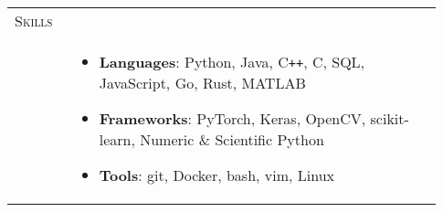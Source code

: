 \documentclass[letterpaper, 10pt, oneside]{article}
\newcommand{\stitle}[1]{\normalsize{\textsc{#1}}}
\newcommand{\bdit}[1]{{\textbf{#1}}}
\begin{document}
\begin{longtable}{@{} p{0.13\linewidth} p{0.8\linewidth}}
    \stitle{Skills}                                   &                                                                                                                                                                                                       \\[-2.34ex]
                                                      & \parbox{0.8\textwidth}{                                                                                                                                                                               %
        \begin{itemize}[leftmargin=0ex, itemsep=-0.4ex, topsep=-2ex, label={}]
            \item \bdit{Languages}: Python, Java, C\texttt{++}, C, SQL, JavaScript, Go, Rust, MATLAB
            \item \bdit{Frameworks}:  PyTorch, Keras, OpenCV, scikit-learn, Numeric \& Scientific Python
            \item \bdit{Tools}:     git, Docker, bash, vim, Linux
        \end{itemize}
    }
    \\
    \\[1ex]


\end{longtable}
\end{document}
